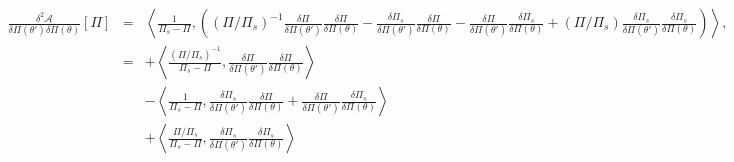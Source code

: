 \begin{eqnarray*}
	\frac{\delta^2 \mathcal{A}}{\delta \Pi(\theta') \delta \Pi(\theta) }[\Pi] & = & \left \langle \frac{1}{\Pi_s - \Pi }  , \left ( (\Pi/\Pi_s)^{-1} \frac{\delta \Pi }{\delta \Pi (\theta') } \frac{\delta \Pi }{\delta \Pi (\theta)   } - \frac{\delta \Pi_s }{\delta \Pi (\theta') } \frac{\delta \Pi }{\delta \Pi (\theta)} - \frac{\delta \Pi }{\delta \Pi (\theta') } \frac{\delta \Pi_s }{\delta \Pi (\theta)} + (\Pi/\Pi_s)\frac{\delta \Pi_s }{\delta \Pi (\theta') } \frac{\delta \Pi_s }{\delta \Pi (\theta)} \right) \right \rangle	,\\
	& = & +\left \langle \frac{ (\Pi/\Pi_s)^{-1}}{\Pi_s - \Pi }  , \frac{\delta \Pi }{\delta \Pi (\theta') } \frac{\delta \Pi }{\delta \Pi (\theta)}  \right \rangle\\
	& & - \left \langle \frac{ 1}{\Pi_s - \Pi }  , \frac{\delta \Pi_s }{\delta \Pi (\theta') } \frac{\delta \Pi }{\delta \Pi (\theta)}  + \frac{\delta \Pi }{\delta \Pi (\theta') } \frac{\delta \Pi_s }{\delta \Pi (\theta)} \right \rangle\\
	& & +\left \langle \frac{ \Pi/\Pi_s}{\Pi_s - \Pi }  , \frac{\delta \Pi_s }{\delta \Pi (\theta') } \frac{\delta \Pi_s }{\delta \Pi (\theta)}  \right \rangle
\end{eqnarray*}





